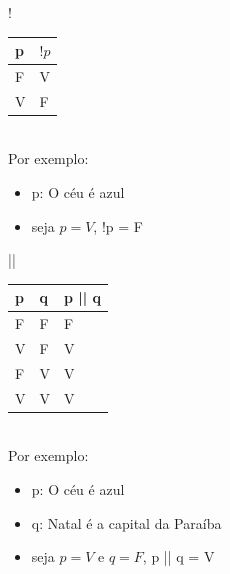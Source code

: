 \documentclass[portuguese,10pt,xcolor=table]{beamer}
\begin{document}
    \begin{frame}
		 !\\
    	\begin{tabular}{|l|l|}
    		\hline
    		\textbf{p} & \textbf{$!p$}\\
    		\hline
    		F& V\\
    		\hline
    		V& F\\
    		\hline
    	\end{tabular}\\\vspace{1cm}
    	Por exemplo:
    	\begin{itemize}
    		\item p: O céu é azul
    		\item seja $p = V$, !p = F
    	\end{itemize}
    \end{frame}
    
    \begin{frame}
		 ||\\
    	\begin{tabular}{|l|l|l|}
    		\hline
    		\textbf{p} & \textbf{q} & \textbf{p || q}\\
    		\hline
    		F& F& F\\
    		\hline
    		V& F& V\\
    		\hline
    		F& V& V\\
    		\hline
    		V& V& V\\
    		\hline
    	\end{tabular}\\\vspace{1cm}
    	Por exemplo:
    	\begin{itemize}
    		\item p: O céu é azul
			\item q: Natal é a capital da Paraíba
    		\item seja $p = V$ e $q = F$, p || q = V
    	\end{itemize}
    \end{frame}
    
\end{document}
